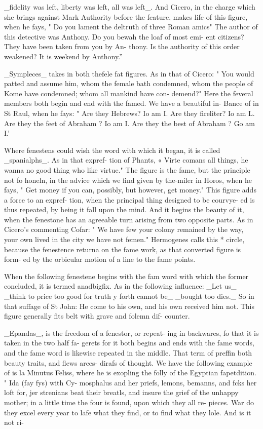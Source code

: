 \_fidelity was left, liberty was left, all was left\_. And
Cicero, in the charge which she brings against Mark
Authority before the feature, makes life of this figure,
when he fays, " Do you lament the deltruth of
three Roman amics" The author of this detective
was Anthony. Do you bewah the loaf of most emi-
ent citizens? They have been taken from you by An-
thony. Is the authority of this order weakened? It
is weekend by Anthony.”\par\medskip
\_Sympleces\_ takes in both thefele fat figures. As in that
of Cicero: " You would patted and assume him,
whom the female bath condemned, whom the people of
Kome have condemned; whom all mankind have con-
demend?" Here the feveral members both begin and
end with the famed. We have a beautiful in-
Bance of in St Raul, when he fays: " Are they
Hebrews? Io am I. Are they fireliter? Io am L.
Are they the feet of Abraham ? Io am I.
Are they the best of Abraham ? Go am I.’\par\medskip
Where fenestens could wish the word with which
it began, it is called \_spanialphs\_. As in that expref-
tion of Phants, « Virte comans all things, he wanna
no good thing who like virtue." The figure is the
fame, but the principle not fo honeln, in the advice
which we find given by the-miler in Horos, when he
fays, " Get money if you can, possibly, but however,
get money." This figure adds a force to an expref-
tion, when the principal thing designed to be courvye-
ed is thus repeated, by being it fall upon the mind.
And it begins the beauty of it, when the fenestone
has an agreeable turn arising from two opposite parts.
As in Cicero's commenting Cofar: " We have few
your colony remained by the way, your own
lived in the city we have not femen." Hermogenes
calls this * circle, because the fenestence returna
on the fame work, as that converted figure is form-
ed by the orbicular motion of a line to the fame
points.\par\medskip
When the following fenestene begins with the fam
word with which the former concluded, it is termed
anadbigfix. As in the following influence: \_Let us\_
\_think to price too good for truth y forth cannot be\_
\_bought too dies.\_ So in that suffage of St John: He
come to his own, and his own received him not. This
figure generally fits belt with grave and folemn dif-
counter.\par\medskip
\_Epandas\_, is the freedom of a fenestor, or repeat-
ing in backwares, fo that it is taken in the two half fa-
gerets for it both begins and ends with the fame words,
and the fame word is likewise repeated in the middle.
That term of preffin both beauty traits, and flews arees-
dirafs of thought. We have the following example of is
la Minutus Feliss, where he is exopling the folly of the
Egyptian fapetdition. " Ida (fay fys) with Cy-
mosphalus and her priefs, lemons, bemanns, and
fcks her loft for, jer strenians beat their breatls,
and insure the grief of the unhappy mother; in a
little time the four is found, upon which they all re-
pieces. War do they excel every year to lafe what
they find, or to find what they lole. And is it not ri-\par\medskip
